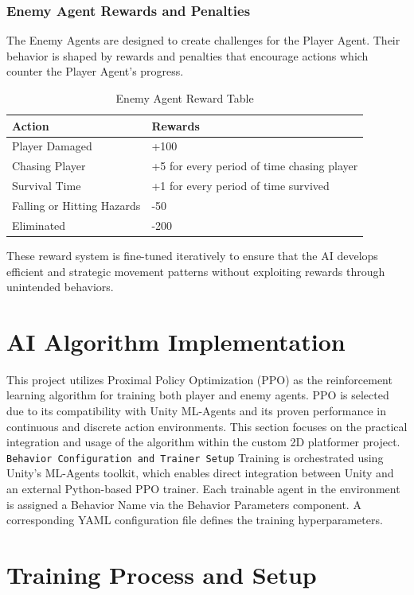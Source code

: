 \documentclass[12pt,oneside,openright,a4paper]{cpe-english-project}
\begin{document}
\subsubsection{Enemy Agent Rewards and Penalties}
The Enemy Agents are designed to create challenges for the Player Agent. Their behavior is shaped by rewards and penalties that encourage actions which counter the Player Agent's progress.\par
\begin{table}[!h]
\caption{Enemy Agent Reward Table}\label{tbl:Enemy Agent Reward Table}
\begin{tabular}{|l|l|} \hline
\textbf{Action} & \textbf{Rewards} \\ \hline
Player Damaged & +100  \\ 
Chasing Player & +5  for every period of time chasing player \\ 
Survival Time & +1 for every period of time survived \\
Falling or Hitting Hazards & -50 \\ 
Eliminated & -200 \\ \hline
\end{tabular}
\end{table}
These reward system is fine-tuned iteratively to ensure that the AI develops efficient and strategic movement patterns without exploiting rewards through unintended behaviors.\par

\section{AI Algorithm Implementation}
This project utilizes Proximal Policy Optimization (PPO) as the reinforcement learning algorithm for training both player and enemy agents. PPO is selected due to its compatibility with Unity ML-Agents and its proven performance in continuous and discrete action environments. This section focuses on the practical integration and usage of the algorithm within the custom 2D platformer project.
\texttt{Behavior Configuration and Trainer Setup}
Training is orchestrated using Unity’s ML-Agents toolkit, which enables direct integration between Unity and an external Python-based PPO trainer. Each trainable agent in the environment is assigned a Behavior Name via the Behavior Parameters component. A corresponding YAML configuration file defines the training hyperparameters.

\section{Training Process and Setup}
\end{document}
